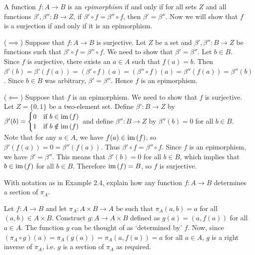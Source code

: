 \begin{solution}
	A function $f:A\to B$ is an \textit{epimorphism} if and only if for all sets $Z$
	and all functions $\beta',\beta'':B\to Z$, if $\beta'\circ f = \beta''\circ f$,
	then $\beta' = \beta''$. Now we will show that $f$ is a surjection if and only if
	it is an epimorphism.
	
	($\implies$) Suppose that $f:A\to B$ is surjective. Let $Z$ be a set and
	$\beta',\beta'':B\to Z$ be functions such that $\beta'\circ f = \beta''\circ f$.
	We need to show that $\beta' = \beta''$. Let $b\in B$. Since $f$ is surjective,
	there exists an $a\in A$ such that $f(a) = b$. Then $\beta'(b) = \beta'(f(a)) =
	(\beta'\circ f)(a) = (\beta''\circ f)(a) = \beta''(f(a)) = \beta''(b)$. Since
	$b\in B$ was arbitrary, $\beta' = \beta''$. Hence $f$ is an epimorphism.
	
	($\impliedby$) Suppose that $f$ is an epimorphism. We need to show that $f$ is
	surjective. Let $Z = \{0,1\}$ be a two-element set. Define $\beta':B\to Z$ by
	$\beta'(b) = \begin{cases} 0 & \text{if } b\in \mathrm{im}\hspace{1.5pt}(f) \\ 1 & \text{if } b\notin
	\mathrm{im}\hspace{1.5pt}(f) \end{cases}$ and define $\beta'':B\to Z$ by $\beta''(b) = 0$ for all $b\in
	B$. Note that for any $a\in A$, we have $f(a)\in\mathrm{im}\hspace{1.5pt}(f)$, so $\beta'(f(a)) = 0 =
	\beta''(f(a))$. Thus $\beta'\circ f = \beta''\circ f$. Since $f$ is an
	epimorphism, we have $\beta' = \beta''$. This means that $\beta'(b) = 0$ for all
	$b\in B$, which implies that $b\in\mathrm{im}\hspace{1.5pt}(f)$ for all $b\in B$. Therefore $\mathrm{im}\hspace{1.5pt}(f) =
	B$, so $f$ is surjective.
\end{solution}


\begin{problem}[2.6]
	With notation as in Example 2.4, explain how any function $f:A\to B$ determines
	a section of $\pi_A$.
\end{problem}

\begin{solution}
	Let $f:A\to B$ and let $\pi_A:A\times B\to A$ be such that $\pi_A(a,b) = a$ for
	all $(a,b)\in A\times B$. Construct $g:A\to A\times B$ defined as $g(a) = (a,
	f(a))$ for all $a\in A$. The function $g$ can be thought of as `determined by'
	$f$. Now, since $(\pi_A\circ g)(a) = \pi_A(g(a)) = \pi_A(a, f(a)) = a$ for all
	$a\in A$, $g$ is a right inverse of $\pi_A$, i.e. $g$ is a section of $\pi_A$ as
	required.
\end{solution}


